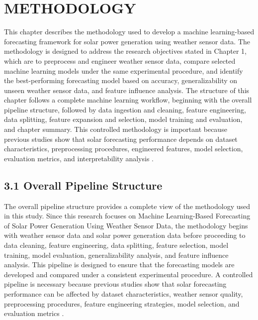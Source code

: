 \chapter{METHODOLOGY}

This chapter describes the methodology used to develop a machine learning-based forecasting framework for solar power generation using weather sensor data. The methodology is designed to address the research objectives stated in Chapter 1, which are to preprocess and engineer weather sensor data, compare selected machine learning models under the same experimental procedure, and identify the best-performing forecasting model based on accuracy, generalizability on unseen weather sensor data, and feature influence analysis. The structure of this chapter follows a complete machine learning workflow, beginning with the overall pipeline structure, followed by data ingestion and cleaning, feature engineering, data splitting, feature expansion and selection, model training and evaluation, and chapter summary. This controlled methodology is important because previous studies show that solar forecasting performance depends on dataset characteristics, preprocessing procedures, engineered features, model selection, evaluation metrics, and interpretability analysis \parencite{JnanaVarshitha2025, Eren2025, TsaiLo2025}.

\section{3.1 Overall Pipeline Structure}

The overall pipeline structure provides a complete view of the methodology used in this study. Since this research focuses on Machine Learning-Based Forecasting of Solar Power Generation Using Weather Sensor Data, the methodology begins with weather sensor data and solar power generation data before proceeding to data cleaning, feature engineering, data splitting, feature selection, model training, model evaluation, generalizability analysis, and feature influence analysis. This pipeline is designed to ensure that the forecasting models are developed and compared under a consistent experimental procedure. A controlled pipeline is necessary because previous studies show that solar forecasting performance can be affected by dataset characteristics, weather sensor quality, preprocessing procedures, feature engineering strategies, model selection, and evaluation metrics \parencite{JnanaVarshitha2025, Bakht2025, Alhassan2025}.

